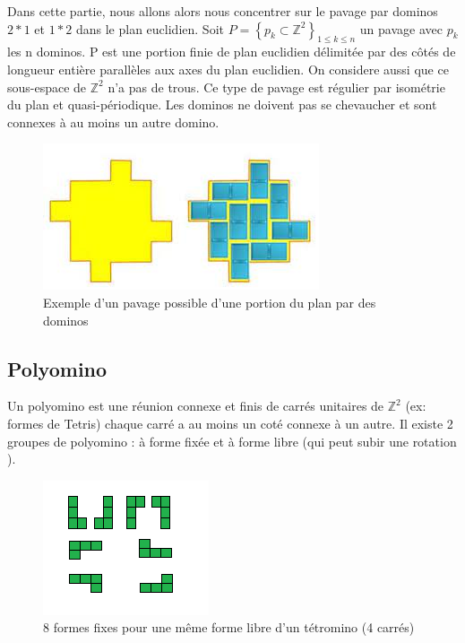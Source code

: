 \documentclass{article}
\begin{document}
Dans cette partie, nous allons alors nous concentrer sur le pavage par dominos $2*1$ et $1*2$ dans le plan euclidien.
Soit  $P=\left \{ p_{k}\subset \mathbb{Z}^{2} \right \}_{1\leq k\leq n}$ un pavage avec $p_{k}$ les n dominos. P est une portion finie de plan euclidien délimitée par des côtés de longueur entière parallèles aux axes du plan euclidien.
On considere aussi que ce sous-espace de $\mathbb{Z}^{2}$ n’a pas de trous. Ce type de pavage est régulier par isométrie du plan et quasi-périodique.
Les dominos ne doivent pas se chevaucher et sont connexes à au moins un autre domino.

\begin{figure} [h]
    \center
    \includegraphics [scale=0.5] {image/pavage_domino.jpg}
    \caption{Exemple d'un pavage possible d'une portion du plan par des dominos }
\end{figure}



\subsection{Polyomino}

Un polyomino est une réunion connexe et finis de carrés unitaires de $\mathbb{Z}^{2}$ (ex: formes de Tetris) chaque carré a au moins un coté connexe à un autre.
Il existe 2 groupes de polyomino : à forme fixée et à forme libre (qui peut subir une rotation ).

\begin{figure} [!h]
    \center
    \includegraphics [scale=0.5] {image/polyomino_libre.png}
    \caption{8 formes fixes pour une même forme libre d'un tétromino (4 carrés)}
\end{figure}
\end{document}
